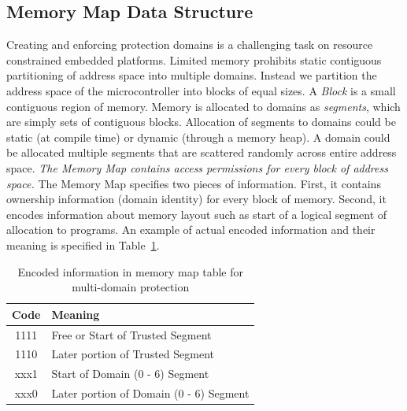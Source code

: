 \subsection{Memory Map Data Structure}
%
%
Creating and enforcing protection domains is a challenging task on resource constrained embedded platforms.
%
Limited memory prohibits static contiguous partitioning of address space into multiple domains.
%
Instead we partition the address space of the microcontroller into blocks of equal sizes.
%
A \textit{Block} is a small contiguous region of memory.
%
Memory is allocated to domains as \textit{segments}, which are simply sets of contiguous blocks.
%
Allocation of segments to domains could be static (at compile time) or dynamic (through a memory heap).
%
A domain could be allocated multiple segments that are scattered randomly across entire address space.
%
\textit{The Memory Map contains access permissions for every block of address space.}
%
The Memory Map specifies two pieces of information.
% 
First, it contains ownership information (domain identity) for every block of memory.
%
Second, it encodes information about memory layout such as start of a logical segment of allocation to programs.
%
An example of actual encoded information and their meaning is specified in Table~\ref{tab:mmap_table}.
%
\begin{table}[htdp]
\centering
\small{
\begin{tabular}{|c|l|}
	\hline
	Code & Meaning\\
	\hline
	1111 & Free or Start of Trusted Segment\\
	1110 & Later portion of Trusted Segment\\
	xxx1 & Start of Domain (0 - 6) Segment \\
	xxx0 & Later portion of Domain (0 - 6) Segment\\
	\hline
\end{tabular}}
\caption{Encoded information in memory map table for multi-domain protection}
\label{tab:mmap_table}
\end{table}
%
%
